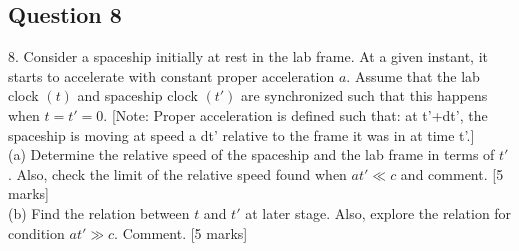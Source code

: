 \documentclass{article}
\begin{document}
\subsection{Question 8}
8. Consider a spaceship initially at rest in the lab frame. At a given instant, it starts to accelerate with constant proper acceleration $a$. Assume that the lab clock $(t)$ and spaceship clock $\left(t'\right)$ are synchronized such that this happens when $t=t'=0$. [Note: Proper acceleration is defined such that: at t'+dt', the spaceship is moving at speed a dt' relative to the frame it was in at time t'.] \\
(a) Determine the relative speed of the spaceship and the lab frame in terms of $t'$. Also, check the limit of the relative speed found when $a t' \ll c$ and comment. [5 marks] \\
(b) Find the relation between $t$ and $t'$ at later stage. Also, explore the relation for condition $a t' \gg c$. Comment. [5 marks] \\
\end{document}
